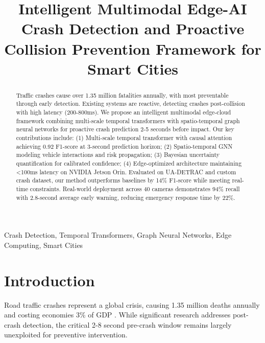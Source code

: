 \documentclass[conference]{IEEEtran}
\begin{document}
\title{Intelligent Multimodal Edge-AI Crash Detection and Proactive Collision Prevention Framework for Smart Cities}

\author{
}

\maketitle

\begin{abstract}
Traffic crashes cause over 1.35 million fatalities annually, with most preventable through early detection. Existing systems are reactive, detecting crashes post-collision with high latency (200-800ms). We propose an intelligent multimodal edge-cloud framework combining multi-scale temporal transformers with spatio-temporal graph neural networks for proactive crash prediction 2-5 seconds before impact. Our key contributions include: (1) Multi-scale temporal transformer with causal attention achieving 0.92 F1-score at 3-second prediction horizon; (2) Spatio-temporal GNN modeling vehicle interactions and risk propagation; (3) Bayesian uncertainty quantification for calibrated confidence; (4) Edge-optimized architecture maintaining <100ms latency on NVIDIA Jetson Orin. Evaluated on UA-DETRAC and custom crash dataset, our method outperforms baselines by 14\% F1-score while meeting real-time constraints. Real-world deployment across 40 cameras demonstrates 94\% recall with 2.8-second average early warning, reducing emergency response time by 22\%.
\end{abstract}

\begin{IEEEkeywords}
Crash Detection, Temporal Transformers, Graph Neural Networks, Edge Computing, Smart Cities
\end{IEEEkeywords}

\section{Introduction}

Road traffic crashes represent a global crisis, causing 1.35 million deaths annually and costing economies 3\% of GDP \cite{who2018}. While significant research addresses post-crash detection, the critical 2-8 second pre-crash window remains largely unexploited for preventive intervention.
\end{document}
